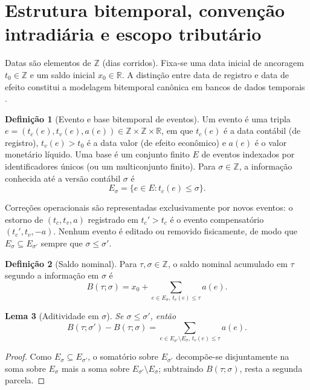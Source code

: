\documentclass[11pt, a4paper]{article}
\theoremstyle{definition}
\newtheorem{definicao}{Definição}[section]
\theoremstyle{plain}
\newtheorem{lema}[definicao]{Lema}
\theoremstyle{remark}
\begin{document}
\section{Estrutura bitemporal, convenção intradiária e escopo tributário}\label{sec:1}

Datas são elementos de $\mathbb{Z}$ (dias corridos). Fixa-se uma data inicial de ancoragem $t_0 \in \mathbb{Z}$ e um saldo inicial $x_0 \in \mathbb{R}$. A distinção entre data de registro e data de efeito constitui a modelagem bitemporal canônica em bancos de dados temporais \cite{Snodgrass1999, JensenSnodgrass1999, Date2014, Kulkarni2012, Fowler2021}.

\begin{definicao}[Evento e base bitemporal de eventos]\label{def:1.1}
Um evento é uma tripla $e = (t_c(e), t_v(e), a(e)) \in \mathbb{Z} \times \mathbb{Z} \times \mathbb{R}$, em que $t_c(e)$ é a data contábil (de registro), $t_v(e) > t_0$ é a data valor (de efeito econômico) e $a(e)$ é o valor monetário líquido. Uma base é um conjunto finito $E$ de eventos indexados por identificadores únicos (ou um multiconjunto finito). Para $\sigma \in \mathbb{Z}$, a informação conhecida até a versão contábil $\sigma$ é
\[
E_\sigma = \{e \in E : t_c(e) \le \sigma\}.
\]
\end{definicao}

Correções operacionais são representadas exclusivamente por novos eventos: o estorno de $(t_c, t_v, a)$ registrado em $t_c' > t_c$ é o evento compensatório $(t_c', t_v, -a)$. Nenhum evento é editado ou removido fisicamente, de modo que $E_\sigma \subseteq E_{\sigma'}$ sempre que $\sigma \le \sigma'$.

\begin{definicao}[Saldo nominal]\label{def:1.2}
Para $\tau, \sigma \in \mathbb{Z}$, o saldo nominal acumulado em $\tau$ segundo a informação em $\sigma$ é
\[
B(\tau; \sigma) = x_0 + \sum_{e \in E_\sigma,\, t_v(e) \le \tau} a(e).
\]
\end{definicao}

\begin{lema}[Aditividade em $\sigma$]\label{lem:1.3}
Se $\sigma \le \sigma'$, então
\[
B(\tau; \sigma') - B(\tau; \sigma) = \sum_{e \in E_{\sigma'} \setminus E_\sigma,\, t_v(e) \le \tau} a(e).
\]
\end{lema}
\begin{proof}
Como $E_\sigma \subseteq E_{\sigma'}$, o somatório sobre $E_{\sigma'}$ decompõe-se disjuntamente na soma sobre $E_\sigma$ mais a soma sobre $E_{\sigma'} \setminus E_\sigma$; subtraindo $B(\tau; \sigma)$, resta a segunda parcela.
\end{proof}
\end{document}
